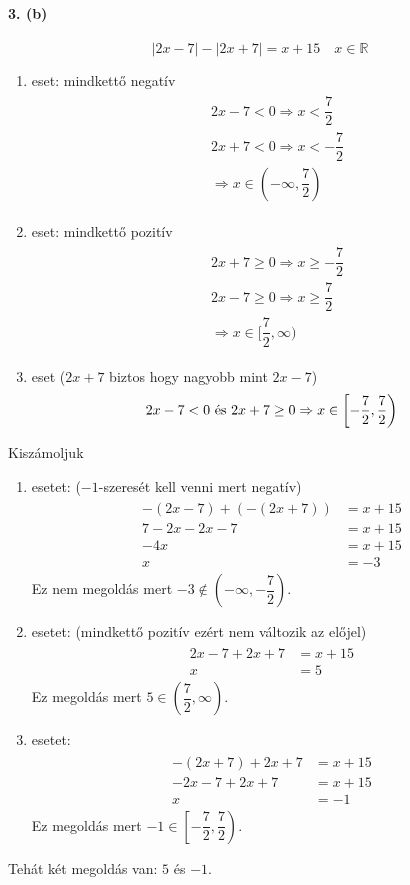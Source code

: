 \documentclass[12pt,a4paper,fleqn]{article}
\newcommand{\myparagraph}[1]{\paragraph{#1}\mbox{}}
\begin{document}
\myparagraph{3. (b)}
\[ |2x-7|-|2x+7|=x+15 \quad x \in \mathbb{R} \]
\begin{enumerate}
  \item eset: mindkettő negatív
  \begin{align*}
    \begin{split}
      &2x - 7 < 0 \Rightarrow x < \dfrac{7}{2} \\
      &2x + 7 < 0 \Rightarrow x < -\dfrac{7}{2} \\
      &\Longrightarrow x \in (-\infty, \dfrac{7}{2})
    \end{split}
  \end{align*}
  \item eset: mindkettő pozitív
  \begin{align*}
    \begin{split}
      &2x + 7 \geq 0 \Rightarrow x \geq -\dfrac{7}{2} \\
      &2x - 7 \geq 0 \Rightarrow x \geq \dfrac{7}{2} \\
      &\Longrightarrow x \in [\dfrac{7}{2}, \infty)
    \end{split}
  \end{align*}
  \item eset ($2x+7$ biztos hogy nagyobb mint $2x-7$)
  \[ 2x-7<0$ és $2x+7 \geq 0 \Rightarrow x \in \left[ -\dfrac{7}{2}, \dfrac{7}{2} \right) \]
\end{enumerate}
Kiszámoljuk
\begin{enumerate}
  \item esetet: ($-1$-szeresét kell venni mert negatív)
  \begin{align*}
    \begin{split}
      -(2x-7)+(-(2x+7)) &= x + 15 \\
      7-2x-2x-7&=x+15 \\
      -4x&=x+15 \\
      x &=-3
    \end{split}
  \end{align*}
  Ez nem megoldás mert $-3 \notin (-\infty, -\dfrac{7}{2})$.
  \item esetet: (mindkettő pozitív ezért nem változik az előjel)
  \begin{align*}
    \begin{split}
      2x-7+2x+7 &= x + 15 \\
      x &= 5
    \end{split}
  \end{align*}
  Ez megoldás mert $5 \in (\dfrac{7}{2}, \infty)$.
  \item esetet:
  \begin{align*}
    \begin{split}
      -(2x+7)+2x+7 &= x + 15 \\
      -2x-7+2x+7 &= x + 15 \\
      x &= -1
    \end{split}
  \end{align*}
  Ez megoldás mert $-1 \in \left[ -\dfrac{7}{2}, \dfrac{7}{2} \right)$.
\end{enumerate}
Tehát két megoldás van: $5$ és $-1$.
\end{document}
